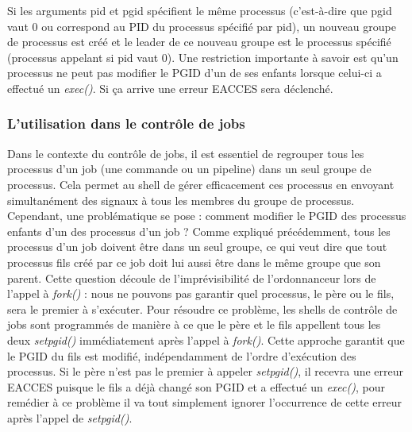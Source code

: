 Si les arguments pid et pgid spécifient le même processus (c'est-à-dire que pgid vaut 0 ou correspond au PID du processus spécifié par pid), un nouveau groupe de processus est créé et le leader de ce nouveau groupe est le processus spécifié (processus appelant si pid vaut 0).
Une restriction importante à savoir est qu’un processus ne peut pas modifier le PGID d’un de ses enfants lorsque celui-ci a effectué un \textit{exec()}. Si ça arrive une erreur EACCES sera déclenché.

\subsubsection{L’utilisation dans le contrôle de jobs}
Dans le contexte du contrôle de jobs, il est essentiel de regrouper tous les processus d'un job (une commande ou un pipeline) dans un seul groupe de processus. Cela permet au shell de gérer efficacement ces processus en envoyant simultanément des signaux à tous les membres du groupe de processus. 
\newline
Cependant, une problématique se pose : comment modifier le PGID des processus enfants d'un des processus d'un job ?
Comme expliqué précédemment, tous les processus d'un job doivent être dans un seul groupe, ce qui veut dire que tout processus fils créé par ce job doit lui aussi être dans le même groupe que son parent.
\newline
Cette question découle de l'imprévisibilité de l'ordonnanceur lors de l'appel à \textit{fork()} : nous ne pouvons pas garantir quel processus, le père ou le fils, sera le premier à s'exécuter.
Pour résoudre ce problème, les shells de contrôle de jobs sont programmés de manière à ce que le père et le fils appellent tous les deux \textit{setpgid()} immédiatement après l'appel à \textit{fork()}. Cette approche garantit que le PGID du fils est modifié, indépendamment de l'ordre d'exécution des processus. Si le père n’est pas le premier à appeler \textit{setpgid()}, il recevra une erreur EACCES puisque le fils a déjà changé son PGID et a effectué un \textit{exec()}, pour remédier à ce problème il va tout simplement ignorer l’occurrence de cette erreur après l’appel de \textit{setpgid()}.

